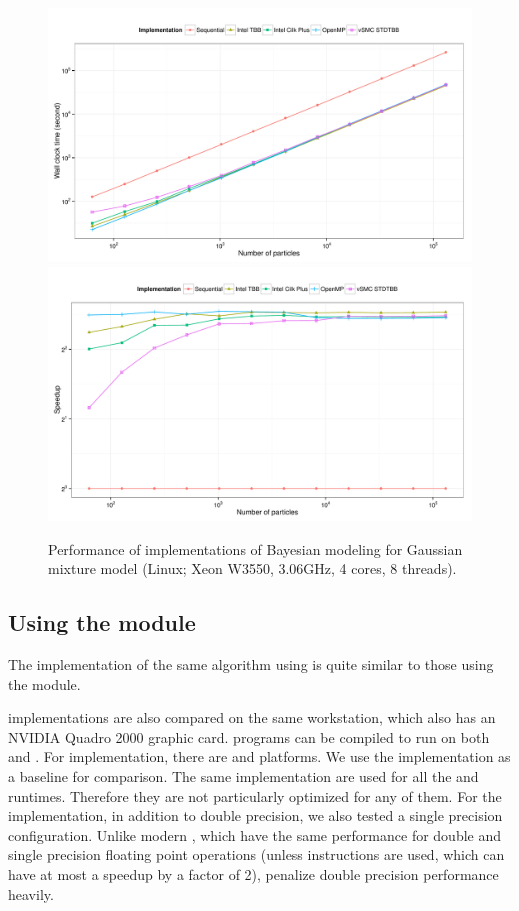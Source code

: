 \begin{figure}
  \centering
  \includegraphics[width=\linewidth]{fig/bench-smp-time-running}
  \includegraphics[width=\linewidth]{fig/bench-smp-speedup-running}
  \caption{Performance of \cpp implementations of Bayesian modeling for
    Gaussian mixture model (Linux; Xeon W3550, 3.06GHz, 4 cores, 8 threads).}
  \label{fig:bench-smp-perf}
\end{figure}

\subsection{Using the \protect\opencl module}
\label{sub:Using the OpenCL module}

The implementation of the same algorithm using \opencl is quite similar to
those using the \smp module.

\opencl implementations are also compared on the same workstation, which also
has an NVIDIA Quadro 2000 graphic card. \opencl programs can be compiled to
run on both \cpu and \gpu. For \cpu implementation, there are \iocl and \aocl
platforms. We use the \tbb implementation as a baseline for comparison.  The
same \opencl implementation are used for all the \cpu and \gpu runtimes.
Therefore they are not particularly optimized for any of them. For the \gpu
implementation, in addition to double precision, we also tested a single
precision configuration. Unlike modern \cpu, which have the same performance
for double and single precision floating point operations (unless \simd
instructions are used, which can have at most a speedup by a factor of 2),
\gpu penalize double precision performance heavily.

